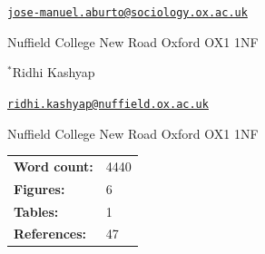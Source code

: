 \documentclass[12pt]{article}
\begin{document}
\begin{titlepage}
{\href{mailto:jose-manuel.aburto@sociology.ox.ac.uk}{\texttt{jose-manuel.aburto@sociology.ox.ac.uk}}

Nuffield College
New Road
Oxford OX1 1NF

\vspace{1em}

$^{*}$Ridhi Kashyap

\href{mailto:ridhi.kashyap@nuffield.ox.ac.uk}{\texttt{ridhi.kashyap@nuffield.ox.ac.uk}}

Nuffield College
New Road
Oxford OX1 1NF

\par\medskip}

\noindent\begin{tabular}{@{}ll}
\textbf{Word count:} & 4440 \\
\textbf{Figures:} &  6 \\
\textbf{Tables:} & 1 \\
\textbf{References:} & 47
\end{tabular}

\clearpage


\end{titlepage}
\end{document}
